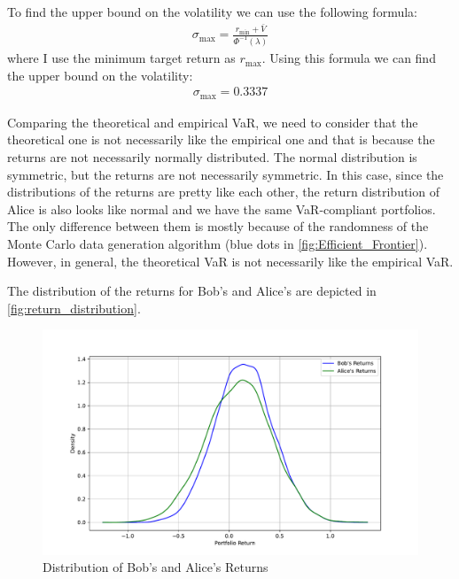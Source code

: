 \documentclass[a4paper,10pt,american]{article}
\begin{document}
To find the upper bound on the volatility we can use the following formula:
\begin{align}
    \sigma_{\text{max}} = \frac{r_{\text{min}}+\bar{V}}{\Phi^{-1}(\lambda)}
\end{align}
where I use the minimum target return as $r_{\text{max}}$. Using this formula we can find the upper bound on the volatility:
\begin{align}
    \sigma_{\text{max}} = 0.3337
\end{align}

Comparing the theoretical and empirical VaR, we need to consider that the theoretical one is not necessarily like the empirical one and that is because the returns are not necessarily normally distributed. The normal distribution is symmetric, but the returns are not necessarily symmetric. In this case, since the distributions of the returns are pretty like each other, the return distribution of Alice is also looks like normal and we have the same VaR-compliant portfolios. The only difference between them is mostly because of the randomness of the Monte Carlo data generation algorithm (blue dots in \autoref{fig:Efficient_Frontier}). However, in general, the theoretical VaR is not necessarily like the empirical VaR. 

The distribution of the returns for Bob's and Alice's are depicted in \autoref{fig:return_distribution}.

\begin{figure}[H]
    \centering
    \includegraphics[width=1\linewidth]{../Plots/return_distribution.pdf}
    \caption{Distribution of Bob's and Alice's Returns}
    \label{fig:return_distribution}
\end{figure}






















% 
\end{document}
